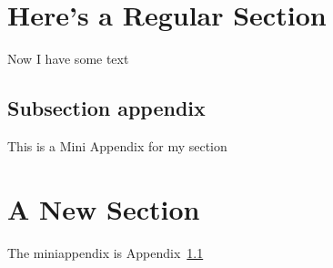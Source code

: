\section{Here's a Regular Section}

Now I have some text

\begin{subappendices}

\subsection{Subsection appendix}\label{sec:miniappendix}
This is a Mini Appendix for my section

\end{subappendices}

\section{A New Section}

The miniappendix is Appendix~\ref{sec:miniappendix}
